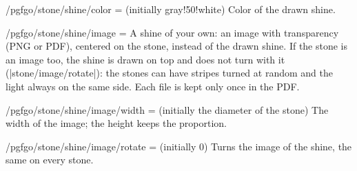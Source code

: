 \begin{key}{/pgfgo/stone/shine/color =  (initially gray!50!white)}
	Color of the drawn shine.

	\begin{codeexample}[width=4cm]

		\begin{goban}
		\end{goban}
	\end{codeexample}
\end{key}

\begin{key}{/pgfgo/stone/shine/image = }
	A shine of your own: an image with transparency (PNG or PDF), centered on the stone, instead of the drawn shine. If the stone is an image too, the shine is drawn on top and does not turn with it (|stone/image/rotate|): the stones can have stripes turned at random and the light always on the same side. Each file is kept only once in the PDF.

	\begin{codeexample}[]
		\begin{goban}[5, partial = B2:D4]
			\stones[w, image = {file = pgfgo-yunzi-white-1.png, rotate = random},
				shine = {true, image = {file = pgfgo-shine.png}}]{B2, C2, D2, B3, C3, D3}
		\end{goban}
	\end{codeexample}
\end{key}


\begin{key}{/pgfgo/stone/shine/image/width =  (initially the diameter of the stone)}
	The width of the image; the height keeps the proportion.
\end{key}

\begin{key}{/pgfgo/stone/shine/image/rotate =  (initially 0)}
	Turns the image of the shine, the same on every stone.

	\begin{codeexample}[]
		\begin{goban}[5, partial = B2:D4]
			\stones[w, image = {file = pgfgo-yunzi-white-1.png},
				shine = {true, image = {file = pgfgo-shine.png, width = 0.3cm,
					rotate = 90}}]{B2:D3}
		\end{goban}
	\end{codeexample}
\end{key}

